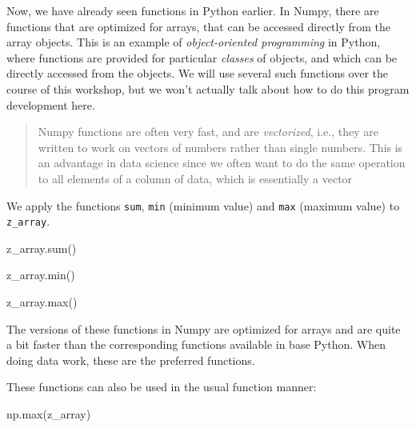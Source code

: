 \documentclass[
  letterpaper,
]{scrbook}
\newenvironment{Shaded}{\begin{snugshade}}{\end{snugshade}}
\newcommand{\BuiltInTok}[1]{#1}
\newcommand{\NormalTok}[1]{#1}
\begin{document}
Now, we have already seen functions in Python earlier. In Numpy, there are functions that are optimized for arrays, that can be accessed directly from the array objects. This is an example of \emph{object-oriented programming} in Python, where functions are provided for particular \emph{classes} of objects, and which can be directly accessed from the objects. We will use several such functions over the course of this workshop, but we won't actually talk about how to do this program development here.

\begin{quote}
Numpy functions are often very fast, and are \emph{vectorized}, i.e., they are written to work on vectors of numbers rather than single numbers. This is an advantage in data science since we often want to do the same operation to all elements of a column of data, which is essentially a vector
\end{quote}

We apply the functions \texttt{sum}, \texttt{min} (minimum value) and \texttt{max} (maximum value) to \texttt{z\_array}.

\begin{Shaded}
\begin{Highlighting}[]
\NormalTok{z\_array.}\BuiltInTok{sum}\NormalTok{()}
\end{Highlighting}
\end{Shaded}

\begin{Shaded}
\begin{Highlighting}[]
\NormalTok{z\_array.}\BuiltInTok{min}\NormalTok{()}
\end{Highlighting}
\end{Shaded}

\begin{Shaded}
\begin{Highlighting}[]
\NormalTok{z\_array.}\BuiltInTok{max}\NormalTok{()}
\end{Highlighting}
\end{Shaded}

The versions of these functions in Numpy are optimized for arrays and are quite a bit faster than the corresponding functions available in base Python. When doing data work, these are the preferred functions.

These functions can also be used in the usual function manner:

\begin{Shaded}
\begin{Highlighting}[]
\NormalTok{np.}\BuiltInTok{max}\NormalTok{(z\_array)}
\end{Highlighting}
\end{Shaded}
\end{document}
